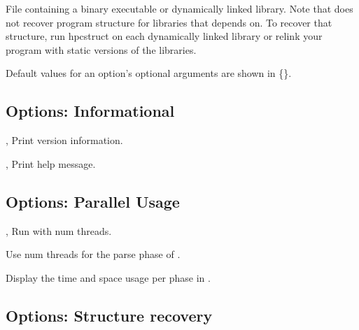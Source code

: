 \documentclass[english]{article}
\begin{document}

\begin{Description}
\item[\Arg{binary}] File containing a binary executable or dynamically linked library.
Note that  does not recover program structure for libraries that  depends on.
To recover that structure, run hpcstruct on each dynamically linked library
or relink your program with static versions of the libraries.
\end{Description}

Default values for an option's optional arguments are shown in \{\}.

\subsection{Options: Informational}

\begin{Description}

\item[\Opt{-V}, \Opt{--version}]
Print version information.

\item[\Opt{-h}, \Opt{--help}]
Print help message.

\end{Description}

\subsection{Options: Parallel Usage}

\begin{Description}
\item[\OptArg{-j}{num}, \OptArg{--jobs}{num}]
Run  with num threads.

\item[\OptArg{--jobs-parse}{num}]
Use num threads for the parse phase of .

\item[\Opt{--time}]
Display the time and space usage per phase in .

\end{Description}

\subsection{Options: Structure recovery}
\end{document}
